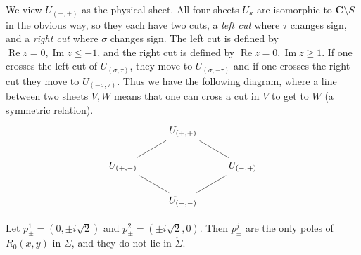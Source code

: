 \documentclass[reqno,12pt,letterpaper]{amsart}
\newcommand{\CC}{\mathbf{C}}
\renewcommand{\Re}{\operatorname{Re}}
\renewcommand{\Im}{\operatorname{Im}}
\theoremstyle{definition}
\begin{document}
We view $U_{(+,+)}$ as the physical sheet. All four sheets $U_\kappa$ are isomorphic to $\CC \setminus S$ in the obvious way, so they each have two cuts, a \emph{left cut} where $\tau$ changes sign, and a \emph{right cut} where $\sigma$ changes sign.
The left cut is defined by $\Re z = 0, \Im z \leq -1$, and the right cut is defined by $\Re z = 0, \Im z \geq 1$.
If one crosses the left cut of $U_{(\sigma, \tau)}$, they move to $U_{(\sigma, -\tau)}$ and if one crosses the right cut they move to $U_{(-\sigma, \tau)}$.
Thus we have the following diagram, where a line between two sheets $V,W$ means that one can cross a cut in $V$ to get to $W$ (a symmetric relation).
$$\begin{tikzcd}
&U_{(+,+)} \arrow[dash,dl] \arrow[dash,dr]\\
U_{(+, -)} \arrow[dash,dr] && U_{(-,+)} \arrow[dash,dl]\\
&U_{(-,-)}
\end{tikzcd}$$

Let $p_\pm^1 = (0, \pm i\sqrt 2)$ and $p_\pm^2 = (\pm i\sqrt 2, 0)$.
Then $p_\pm^j$ are the only poles of $R_0(x, y)$ in $\Sigma$, and they do not lie in $\mathring \Sigma$.
\end{document}
